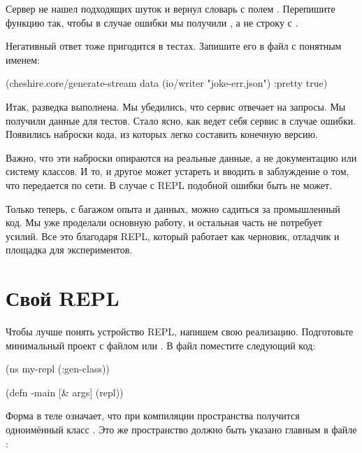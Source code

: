 Сервер не нашел подходящих шуток и вернул словарь с полем . Перепишите функцию так, чтобы в случае ошибки мы получили , а не строку с .

Негативный ответ тоже пригодится в тестах. Запишите его в файл с понятным именем:

\begin{english}
  \begin{clojure}
(cheshire.core/generate-stream
  data
  (io/writer "joke-err.json")
  {:pretty true})
  \end{clojure}
\end{english}

Итак, разведка выполнена. Мы убедились, что сервис отвечает на запросы. Мы получили данные для тестов. Стало ясно, как ведет себя сервис в случае ошибки. Появились наброски кода, из которых легко составить конечную версию.

Важно, что эти наброски опираются на реальные данные, а не документацию или систему классов. И то, и другое может устареть и вводить в заблуждение о том, что передается по сети. В случае с REPL подобной ошибки быть не может.

Только теперь, с багажом опыта и данных, можно садиться за промышленный код. Мы уже проделали основную работу, и остальная часть не потребует усилий. Все это благодаря REPL, который работает как черновик, отладчик и площадка для экспериментов.

\section{Свой REPL}


Чтобы лучше понять устройство REPL, напишем свою реализацию. Подготовьте минимальный проект с файлом  или . В файл  поместите следующий код:

\begin{english}
  \begin{clojure/lines}
(ns my-repl
  (:gen-class))

(defn -main [& args]
  (repl))
  \end{clojure/lines}
\end{english}

Форма  в теле  означает, что при компиляции пространства получится одноимённый класс . Это же пространство должно быть указано главным в файле :


